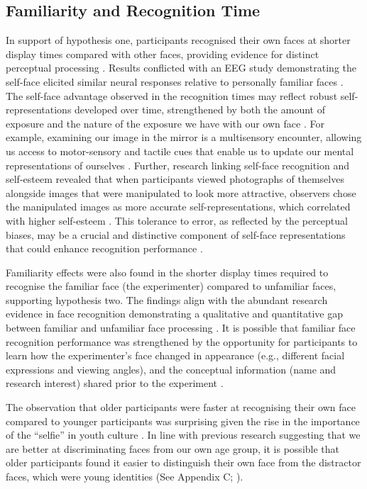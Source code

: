 \documentclass[
  10pt,
  letterpaper,
]{article}
\begin{document}
\subsection{Familiarity and Recognition
Time}\label{familiarity-and-recognition-time}

In support of hypothesis one, participants recognised their own faces at
shorter display times compared with other faces, providing evidence for
distinct perceptual processing \citep{alzueta2019a, rooney2012a}.
Results conflicted with an EEG study demonstrating the self-face
elicited similar neural responses relative to personally familiar faces
\citep{wiese2021a}. The self-face advantage observed in the recognition
times may reflect robust self-representations developed over time,
strengthened by both the amount of exposure and the nature of the
exposure we have with our own face \citep{bortolon2017a, tong1999a}. For
example, examining our image in the mirror is a multisensory encounter,
allowing us access to motor-sensory and tactile cues that enable us to
update our mental representations of ourselves \citep{bortolon2017a}.
Further, research linking self-face recognition and self-esteem revealed
that when participants viewed photographs of themselves alongside images
that were manipulated to look more attractive, observers chose the
manipulated images as more accurate self-representations, which
correlated with higher self-esteem \citep{felisberti2014a}. This
tolerance to error, as reflected by the perceptual biases, may be a
crucial and distinctive component of self-face representations that
could enhance recognition performance \citep{felisberti2014a}.

Familiarity effects were also found in the shorter display times
required to recognise the familiar face (the experimenter) compared to
unfamiliar faces, supporting hypothesis two. The findings align with the
abundant research evidence in face recognition demonstrating a
qualitative and quantitative gap between familiar and unfamiliar face
processing \citep{burton2013a, burton2016a, ramon2017a}. It is possible
that familiar face recognition performance was strengthened by the
opportunity for participants to learn how the experimenter's face
changed in appearance (e.g., different facial expressions and viewing
angles), and the conceptual information (name and research interest)
shared prior to the experiment \citep{dowsett2016a}.

The observation that older participants were faster at recognising their
own face compared to younger participants was surprising given the rise
in the importance of the ``selfie'' in youth culture
\citep{tshidzumba2019a}. In line with previous research suggesting that
we are better at discriminating faces from our own age group, it is
possible that older participants found it easier to distinguish their
own face from the distractor faces, which were young identities (See
Appendix C; \citet{rhodes2012a}).
\end{document}
